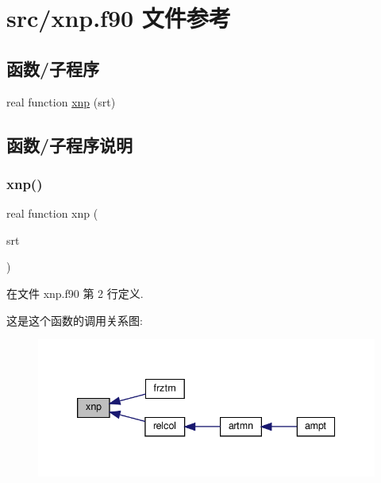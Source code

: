\hypertarget{xnp_8f90}{}\section{src/xnp.f90 文件参考}
\label{xnp_8f90}
\subsection*{函数/子程序}
\begin{DoxyCompactItemize}
\item 
real function \mbox{\hyperlink{xnp_8f90_a7ecb9c252aae7936daaeb022ebe26cc3}{xnp}} (srt)
\end{DoxyCompactItemize}


\subsection{函数/子程序说明}
\mbox{\label{xnp_8f90_a7ecb9c252aae7936daaeb022ebe26cc3}} 
\subsubsection{\texorpdfstring{xnp()}{xnp()}}
{\footnotesize\ttfamily real function xnp (\begin{DoxyParamCaption}\item[{}]{srt }\end{DoxyParamCaption})}



在文件 xnp.\+f90 第 2 行定义.

这是这个函数的调用关系图\+:
\nopagebreak
\begin{figure}[H]
\begin{center}
\leavevmode
\includegraphics[width=339pt]{xnp_8f90_a7ecb9c252aae7936daaeb022ebe26cc3_icgraph}
\end{center}
\end{figure}
